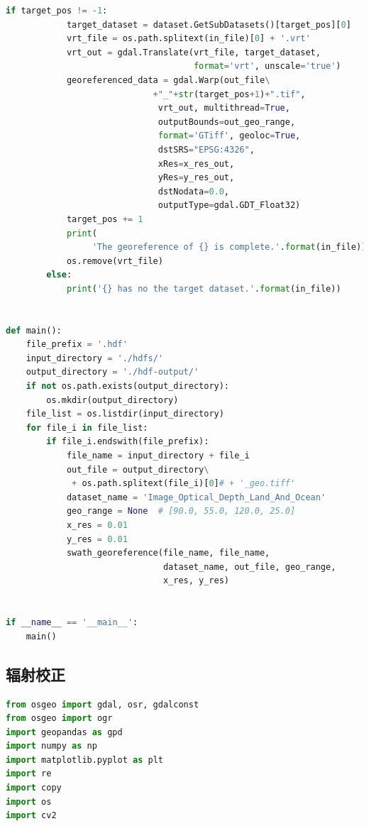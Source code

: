 \documentclass{ctexart}
\begin{document}
\begin{sloppypar}
\begin{appendices}
\begin{lstlisting}[frame=single, language=Python,  basicstyle={\ttfamily}, caption={几何校正}, label=codegeom_corr]
        if target_pos != -1:
            target_dataset = dataset.GetSubDatasets()[target_pos][0]
            vrt_file = os.path.splitext(in_file)[0] + '.vrt'
            vrt_out = gdal.Translate(vrt_file, target_dataset,
                                     format='vrt', unscale='true')
            georeferenced_data = gdal.Warp(out_file\
                             +"_"+str(target_pos+1)+".tif",
                              vrt_out, multithread=True,
                              outputBounds=out_geo_range,
                              format='GTiff', geoloc=True,
                              dstSRS="EPSG:4326",
                              xRes=x_res_out,
                              yRes=y_res_out,
                              dstNodata=0.0,
                              outputType=gdal.GDT_Float32)
            target_pos += 1
            print(
                 'The georeference of {} is complete.'.format(in_file))
            os.remove(vrt_file)
        else:
            print('{} has no the target dataset.'.format(in_file))


def main():
    file_prefix = '.hdf'
    input_directory = './hdfs/'
    output_directory = './hdf-output/'
    if not os.path.exists(output_directory):
        os.mkdir(output_directory)
    file_list = os.listdir(input_directory)
    for file_i in file_list:
        if file_i.endswith(file_prefix):
            file_name = input_directory + file_i
            out_file = output_directory\
             + os.path.splitext(file_i)[0]# + '_geo.tiff'
            dataset_name = 'Image_Optical_Depth_Land_And_Ocean'
            geo_range = None  # [90.0, 55.0, 120.0, 25.0]
            x_res = 0.01
            y_res = 0.01
            swath_georeference(file_name, file_name,
                               dataset_name, out_file, geo_range,
                               x_res, y_res)


if __name__ == '__main__':
    main()


\end{lstlisting}
\subsection{辐射校正}\label{rad_corr}
\begin{lstlisting}[frame=single, language=Python,  basicstyle={\ttfamily}, caption={辐射校正}, label=coderad_corr]
from osgeo import gdal, osr, gdalconst
from osgeo import ogr
import geopandas as gpd
import numpy as np
import matplotlib.pyplot as plt
import re
import copy
import os
import cv2


\end{lstlisting}
\end{appendices}
\end{sloppypar}
\end{document}
